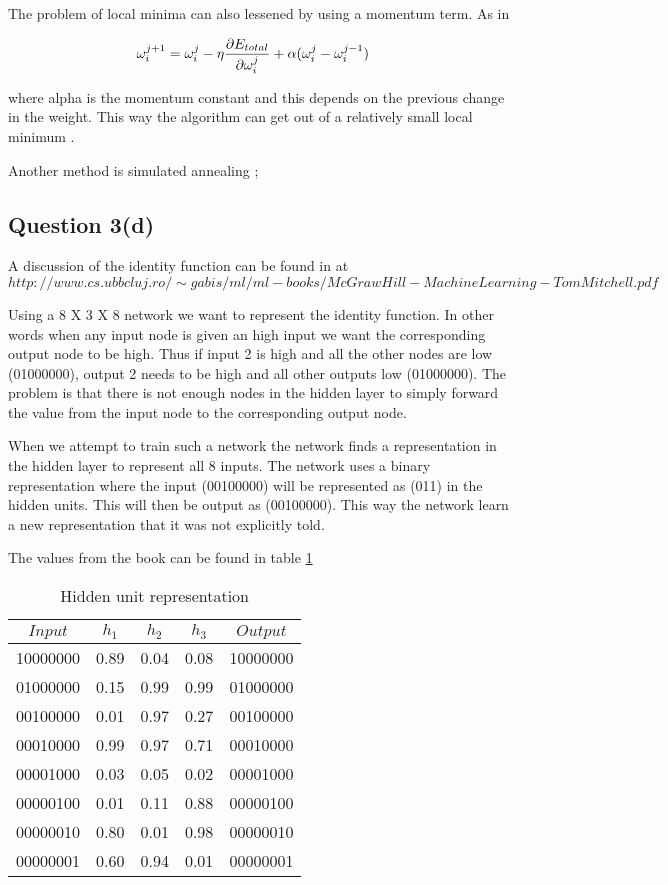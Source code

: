 \documentclass[10pt,a4paper]{article}
\begin{document}
The problem of local minima can also lessened by using a momentum term. As in

\begin{equation}
\begin{split}
\omega_i^{j+1} &= \omega_i^j - \eta\pdv{E_{total}}{\omega_i^j} +\alpha (\omega_i^{j}-\omega_i^{j-1})
\end{split}
\end{equation}

where alpha is the momentum constant and this depends on the previous change in the weight. This way the algorithm can get out of a relatively small local minimum \citep{Michell2009}.

Another method is simulated annealing \citep{rojas};
\subsection{Question 3(d)}

A discussion of the identity function can be found in \citep[p106]{Michell2009} at $http://www.cs.ubbcluj.ro/\sim gabis/ml/ml-books/McGrawHill - Machine Learning -Tom Mitchell.pdf$

Using a 8 X 3 X 8 network we want to represent the identity function. In other words when any input node is given an high input we want the corresponding output node to be high. Thus if input 2 is high and all the other nodes are low (01000000), output 2 needs to be high and all other outputs low (01000000).  The problem is that there is not enough nodes in the hidden layer to simply forward the value from the input node to the corresponding output node. 

When we attempt to train such a network the network finds a representation in the hidden layer to represent all 8 inputs. The network uses a binary representation where the input (00100000) will be represented as (011) in the hidden units. This will then be output as (00100000). This way the network learn a new representation that it was not explicitly told.

The values from the book can be found in table \ref{table2}

\begin{table}
\begin{tabular}{|c|c|c|c|c||}
\hline
$Input$ & $h_1$ & $h_2$ & $h_3$ & $Output$ \\
\hline
10000000 & 0.89 & 0.04 & 0.08 & 10000000 \\
01000000 & 0.15 & 0.99 & 0.99 & 01000000 \\
00100000 & 0.01 & 0.97 & 0.27 & 00100000 \\
00010000 & 0.99 & 0.97 & 0.71 & 00010000 \\
00001000 & 0.03 & 0.05 & 0.02 & 00001000 \\
00000100 & 0.01 & 0.11 & 0.88 & 00000100 \\
00000010 & 0.80 & 0.01 & 0.98 & 00000010 \\
00000001 & 0.60 & 0.94 & 0.01 & 00000001 \\
\hline
\end{tabular}
\caption{Hidden unit representation}\label{table2}
\end{table}
\end{document}
